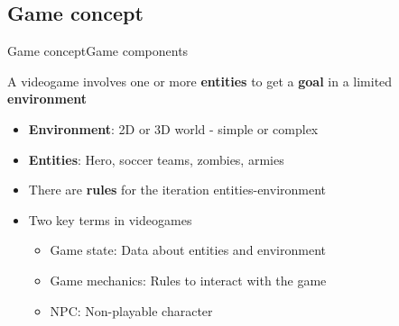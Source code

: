 \documentclass[10pt,compress]{beamer} %
\begin{document}
\subsection[Game concept]{Game concept}
\begin{frame}{Game concept}{Game components}
	\begin{block}{}
	A videogame involves one or more \textbf{entities} to get a \textbf{goal} in a limited \textbf{environment}
	\end{block}

	\begin{itemize}
	\item \textbf{Environment}: 2D or 3D world - simple or complex
	\item \textbf{Entities}: Hero, soccer teams, zombies, armies
	\item There are \textbf{rules} for the iteration entities-environment
	\item Two key terms in videogames
	\begin{itemize}
		\item \alert{Game state}: Data about entities and environment
		\item \alert{Game mechanics}: Rules to interact with the game
		\item NPC: Non-playable character
	\end{itemize}
	\end{itemize}

\end{frame}
\end{document}
